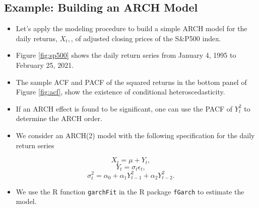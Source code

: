 \documentclass[]{book}
\newenvironment{Shaded}{\begin{snugshade}}{\end{snugshade}}
\newcommand{\CommentTok}[1]{\textcolor[rgb]{0.56,0.35,0.01}{\textit{#1}}}
\newcommand{\DataTypeTok}[1]{\textcolor[rgb]{0.13,0.29,0.53}{#1}}
\newcommand{\DecValTok}[1]{\textcolor[rgb]{0.00,0.00,0.81}{#1}}
\newcommand{\KeywordTok}[1]{\textcolor[rgb]{0.13,0.29,0.53}{\textbf{#1}}}
\newcommand{\NormalTok}[1]{#1}
\newcommand{\OperatorTok}[1]{\textcolor[rgb]{0.81,0.36,0.00}{\textbf{#1}}}
\newcommand{\StringTok}[1]{\textcolor[rgb]{0.31,0.60,0.02}{#1}}
\providecommand{\tightlist}{%
  \setlength{\itemsep}{0pt}\setlength{\parskip}{0pt}}
\begin{document}
\hypertarget{example-building-an-arch-model}{%
\subsection{Example: Building an ARCH Model}\label{example-building-an-arch-model}}

\begin{itemize}
\item
  Let's apply the modeling procedure to build a simple ARCH model for the daily returns, \(X_t,\), of adjusted closing prices of the S\&P500 index.
\item
  Figure \ref{fig:sp500} shows the daily return series from January 4, 1995 to February 25, 2021.
\item
  The sample ACF and PACF of the squared returns in the bottom panel of Figure \ref{fig:acf}, show the existence of conditional heteroscedasticity.
\item
  If an ARCH effect is found to be significant, one can use the PACF of \(Y_t^2\) to determine the ARCH order.
\item
  We consider an ARCH(2) model with the following specification for the daily return series
\end{itemize}

\[X_t=\mu+Y_t,\]
\[Y_t=\sigma_t\epsilon_t,\]
\[\sigma_t^2=\alpha_0+\alpha_1Y_{t-1}^2 + \alpha_2Y_{t-2}^2.\]

\begin{itemize}
\tightlist
\item
  We use the R function \texttt{garchFit} in the R package \texttt{fGarch} to estimate the model.
\end{itemize}

\begin{Shaded}
\end{Shaded}
\end{document}
